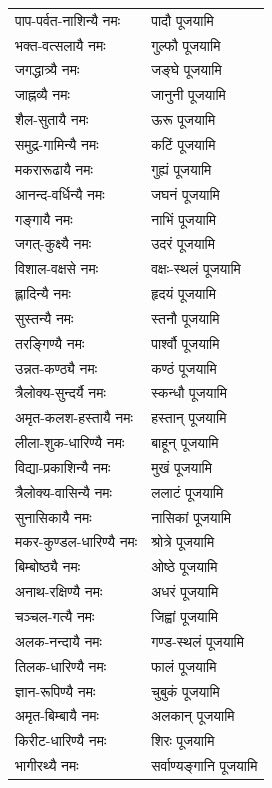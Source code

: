 \begin{center}
\begin{supertabular}{ll}
पाप-पर्वत-नाशिन्यै नमः & पादौ पूजयामि\\
भक्त-वत्सलायै नमः & गुल्फौ पूजयामि\\
जगद्धात्र्यै नमः & जङ्घे पूजयामि\\
जाह्नव्यै नमः & जानुनी पूजयामि\\
शैल-सुतायै नमः & ऊरू पूजयामि\\
समुद्र-गामिन्यै नमः & कटिं पूजयामि\\
मकरारूढायै नमः & गुह्यं पूजयामि\\
आनन्द-वर्धिन्यै नमः & जघनं पूजयामि\\
गङ्गायै नमः & नाभिं पूजयामि\\
जगत्-कुक्ष्यै नमः & उदरं पूजयामि\\
विशाल-वक्षसे नमः & वक्षः-स्थलं पूजयामि\\
ह्लादिन्यै नमः & हृदयं पूजयामि\\
सुस्तन्यै नमः & स्तनौ पूजयामि\\
तरङ्गिण्यै नमः & पार्श्वौ पूजयामि\\
उन्नत-कण्ठ्यै नमः & कण्ठं पूजयामि\\
त्रैलोक्य-सुन्दर्यै नमः & स्कन्धौ पूजयामि\\
अमृत-कलश-हस्तायै नमः & हस्तान् पूजयामि\\
लीला-शुक-धारिण्यै नमः & बाहून् पूजयामि\\
विद्या-प्रकाशिन्यै नमः & मुखं पूजयामि\\
त्रैलोक्य-वासिन्यै नमः & ललाटं पूजयामि\\
सुनासिकायै नमः & नासिकां पूजयामि\\
मकर-कुण्डल-धारिण्यै नमः & श्रोत्रे पूजयामि\\
बिम्बोष्ठ्यै नमः & ओष्ठे पूजयामि\\
अनाथ-रक्षिण्यै नमः & अधरं पूजयामि\\
चञ्चल-गत्यै नमः & जिह्वां पूजयामि\\
अलक-नन्दायै नमः & गण्ड-स्थलं पूजयामि\\
तिलक-धारिण्यै नमः & फालं पूजयामि\\
ज्ञान-रूपिण्यै नमः & चुबुकं पूजयामि\\
अमृत-बिम्बायै नमः & अलकान् पूजयामि\\
किरीट-धारिण्यै नमः & शिरः पूजयामि\\
भागीरथ्यै नमः & सर्वाण्यङ्गानि पूजयामि\\
\end{supertabular}

\end{center}

